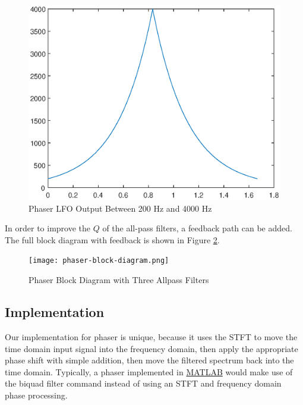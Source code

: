 \begin{figure}[ht]
    \centering
    \includegraphics[scale=0.5]{phaser-lfo-waveform.eps}
    \caption{Phaser LFO Output Between 200 Hz and 4000 Hz}
    \label{fig:phaser-lfo-waveform}
\end{figure}
In order to improve the $Q$ of the all-pass filters, a feedback path can be added. The full block diagram with feedback is shown in Figure \ref{fig:phaser-block-diagram}.
\begin{figure}[ht]
    \centering
    \texttt{[image: phaser-block-diagram.png]}
    \caption{Phaser Block Diagram with Three Allpass Filters}
    \label{fig:phaser-block-diagram}
\end{figure}

\subsection{Implementation}
Our implementation for phaser is unique, because it uses the STFT to move the time domain input signal into the frequency domain, then apply the appropriate phase shift with simple addition, then move the filtered spectrum back into the time domain. Typically, a phaser implemented in \href{run:../phaser.m}{MATLAB} would make use of the biquad filter command instead of using an STFT and frequency domain phase processing.

